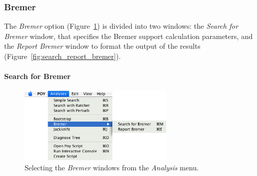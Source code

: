 \subsubsection{Bremer}

The \emph{Bremer} option (Figure~\ref{fig:search_for_bermer_menu}) is divided into two windows: the \emph{Search for Bremer} window, that specifies the Bremer support \cite{Bremer1988, Kallersjoetal1992} calculation parameters, and the \emph{Report Bremer} window to format the output of the results (Figure~\ref{fig:search_report_bremer}). 

\paragraph{Search for Bremer}

\begin{figure}[htpb]
    \begin{center}
        \includegraphics[width=0.65\textwidth]{figures/searchforbremer_menu.jpg}
    \end{center}
    \caption{ Selecting the \emph{Bremer} windows from the \emph{Analysis} menu.}
    \label{fig:search_for_bermer_menu}
\end{figure}

